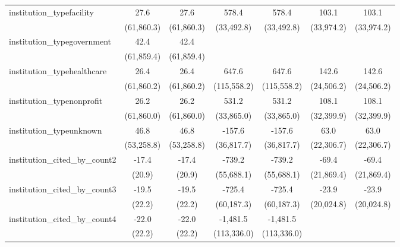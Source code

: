 \begin{tabular}{lcccccc}
   institution\_typefacility             & 27.6         & 27.6         & 578.4        & 578.4        & 103.1      & 103.1\\   
                                         & (61,860.3)   & (61,860.3)   & (33,492.8)   & (33,492.8)   & (33,974.2) & (33,974.2)\\   
   institution\_typegovernment           & 42.4         & 42.4         &              &              &            &   \\   
                                         & (61,859.4)   & (61,859.4)   &              &              &            &   \\   
   institution\_typehealthcare           & 26.4         & 26.4         & 647.6        & 647.6        & 142.6      & 142.6\\   
                                         & (61,860.2)   & (61,860.2)   & (115,558.2)  & (115,558.2)  & (24,506.2) & (24,506.2)\\   
   institution\_typenonprofit            & 26.2         & 26.2         & 531.2        & 531.2        & 108.1      & 108.1\\   
                                         & (61,860.0)   & (61,860.0)   & (33,865.0)   & (33,865.0)   & (32,399.9) & (32,399.9)\\   
   institution\_typeunknown              & 46.8         & 46.8         & -157.6       & -157.6       & 63.0       & 63.0\\   
                                         & (53,258.8)   & (53,258.8)   & (36,817.7)   & (36,817.7)   & (22,306.7) & (22,306.7)\\   
   institution\_cited\_by\_count2        & -17.4        & -17.4        & -739.2       & -739.2       & -69.4      & -69.4\\   
                                         & (20.9)       & (20.9)       & (55,688.1)   & (55,688.1)   & (21,869.4) & (21,869.4)\\   
   institution\_cited\_by\_count3        & -19.5        & -19.5        & -725.4       & -725.4       & -23.9      & -23.9\\   
                                         & (22.2)       & (22.2)       & (60,187.3)   & (60,187.3)   & (20,024.8) & (20,024.8)\\   
   institution\_cited\_by\_count4        & -22.0        & -22.0        & -1,481.5     & -1,481.5     &            &   \\   
                                         & (22.2)       & (22.2)       & (113,336.0)  & (113,336.0)  &            &   \\   

\end{tabular}
